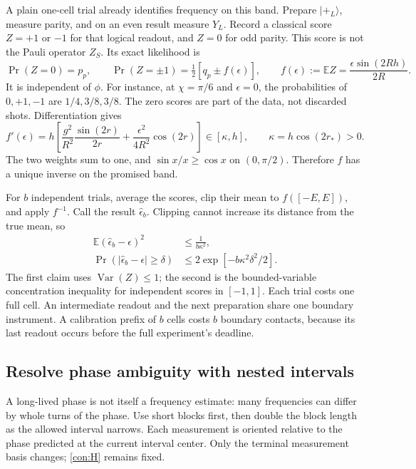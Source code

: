 \documentclass[11pt,a4paper]{article}
\numberwithin{equation}{section}
\theoremstyle{remark}
\DeclareMathOperator{\Var}{Var}
\begin{document}
A plain one-cell trial already identifies frequency on this band. Prepare
$|+_L\rangle$, measure parity, and on an even result measure $Y_L$.
Record a classical score $Z=+1$ or $-1$ for that logical readout, and $Z=0$
for odd parity. This score is not the Pauli operator $Z_S$.
Its exact likelihood is
\begin{equation}
 \Pr(Z=0)=p_p,\qquad
 \Pr(Z=\pm1)=\tfrac12[q_p\pm f(\epsilon)],\qquad
 f(\epsilon):=\mathbb E Z=\frac{\epsilon\sin(2Rh)}{2R}.
\end{equation}
It is independent of $\phi$. For instance, at $\chi=\pi/6$ and
$\epsilon=0$, the probabilities of $0,+1,-1$ are $1/4,3/8,3/8$.
The zero scores are part of the data, not discarded shots.
Differentiation gives
\begin{equation}
 f'(\epsilon)=h\left[
 \frac{g^2}{R^2}\frac{\sin(2r)}{2r}
 +\frac{\epsilon^2}{4R^2}\cos(2r)\right]
 \in[\kappa,h],\qquad \kappa=h\cos(2r_*)>0.
\end{equation}
The two weights sum to one, and $\sin x/x\ge\cos x$ on $(0,\pi/2)$.
Therefore $f$ has a unique inverse on the promised band.

For $b$ independent trials, average the scores, clip their mean to
$f([-E,E])$, and apply $f^{-1}$. Call the result $\widehat\epsilon_b$.
Clipping cannot increase its distance from the true mean, so
\begin{align}
 \mathbb E(\widehat\epsilon_b-\epsilon)^2&\le\frac1{b\kappa^2},\nonumber\\
 \Pr(|\widehat\epsilon_b-\epsilon|\ge\delta)
 &\le2\exp[-b\kappa^2\delta^2/2].
 \label{con:coarse}
\end{align}
The first claim uses $\Var(Z)\le1$; the second is the bounded-variable
concentration inequality for independent scores in $[-1,1]$.
Each trial costs one full cell. An intermediate readout and the next
preparation share one boundary instrument. A calibration prefix of $b$
cells costs $b$ boundary contacts, because its last readout occurs before
the full experiment's deadline.

\subsection{Resolve phase ambiguity with nested intervals}
\label{con:estimator}

A long-lived phase is not itself a frequency estimate: many frequencies
can differ by whole turns of the phase. Use short blocks first, then double
the block length as the allowed interval narrows. Each measurement is
oriented relative to the phase predicted at the current interval center.
Only the terminal measurement basis changes; \eqref{con:H} remains fixed.
\end{document}

